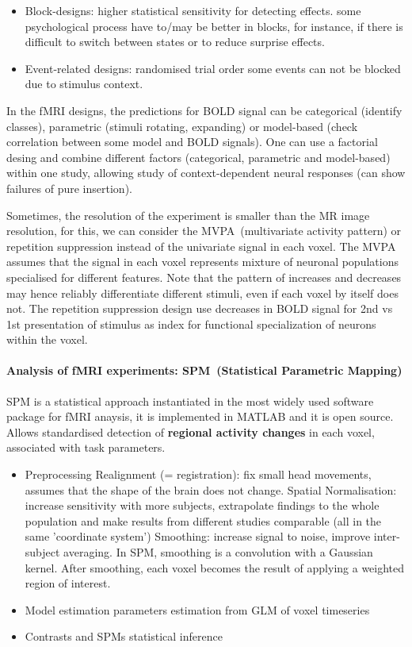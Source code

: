 \documentclass[12pt,article,oneside,a4paper]{memoir}
\begin{document}
\begin{itemize}
\item Block-designs:
\subitem higher statistical sensitivity for detecting effects.
\subitem some psychological process have to/may be better in blocks, for
instance, if there is difficult to switch between states or to reduce surprise
effects.
\item Event-related designs:
\subitem randomised trial order
\subitem some events can not be blocked due to stimulus context.
\end{itemize}

In the fMRI designs, the predictions for BOLD signal can be categorical
(identify classes), parametric (stimuli rotating, expanding) or model-based
(check correlation between some model and BOLD signals). One can use a
factorial desing and combine different factors (categorical, parametric and
model-based) within one study, allowing study of context-dependent neural
responses (can show failures of pure insertion).

Sometimes, the resolution of the experiment is smaller than the MR image
resolution, for this, we can consider the MVPA~(multivariate activity pattern)
or repetition suppression instead of the univariate signal in each voxel. The
MVPA assumes that the signal in each voxel represents mixture of neuronal
populations specialised for different features. Note that the pattern of
increases and decreases may hence reliably differentiate different stimuli,
even if each voxel by itself does not. The repetition suppression design use
decreases in BOLD signal for 2nd vs 1st presentation of stimulus as index for
functional specialization of neurons within the voxel.

\paragraph{Analysis of fMRI experiments: SPM~(Statistical Parametric Mapping)}
SPM is a statistical approach instantiated in the most widely used software
package for fMRI anaysis, it is implemented in MATLAB and it is open source.
Allows standardised detection of \textbf{regional activity changes} in each
voxel, associated with task parameters.

\begin{itemize}
\item Preprocessing
\subitem Realignment (= registration): fix small head movements, assumes that
the shape of the brain does not change.
\subitem Spatial Normalisation: increase sensitivity with more subjects,
extrapolate findings to the whole population and make results from different
studies comparable (all in the same 'coordinate system')
\subitem Smoothing: increase signal to noise, improve inter-subject averaging.
In SPM, smoothing is a convolution with a Gaussian kernel. After smoothing,
each voxel becomes the result of applying a weighted region of interest.
\item Model estimation
\subitem parameters estimation from GLM of voxel timeseries
\item Contrasts and SPMs
\subitem statistical inference
\end{itemize}
\end{document}
